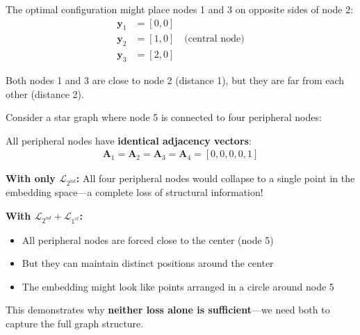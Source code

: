 \begin{notechapter}
The optimal configuration might place nodes 1 and 3 on opposite sides of node 2:
\begin{align*}
\bm{y}_1 &= [0, 0] \\
\bm{y}_2 &= [1, 0] \quad \text{(central node)} \\
\bm{y}_3 &= [2, 0]
\end{align*}

Both nodes 1 and 3 are close to node 2 (distance 1), but they are far from each other (distance 2).

\begin{example}
Consider a star graph where node 5 is connected to four peripheral nodes:

\begin{center}
\end{center}

All peripheral nodes have \textbf{identical adjacency vectors}:
\begin{align*}
\bm{A}_1 = \bm{A}_2 = \bm{A}_3 = \bm{A}_4 = [0, 0, 0, 0, 1]
\end{align*}

\textbf{With only $\mathcal{L}_{2^{nd}}$:} All four peripheral nodes would collapse to a single point in the embedding space—a complete loss of structural information!

\textbf{With $\mathcal{L}_{2^{nd}} + \mathcal{L}_{1^{st}}$:} 
\begin{itemize}
    \item All peripheral nodes are forced close to the center (node 5)
    \item But they can maintain distinct positions around the center
    \item The embedding might look like points arranged in a circle around node 5
\end{itemize}

This demonstrates why \textbf{neither loss alone is sufficient}—we need both to capture the full graph structure.
\end{example}


\end{notechapter}
